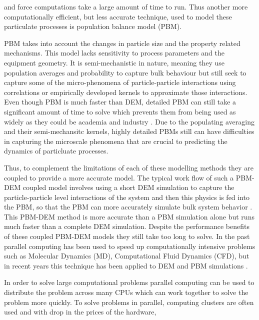 \documentclass[preprint,11pt,authoryear]{elsarticle}
\begin{document}
    and force computations take a large amount of time to run. Thus another more computationally 
    efficient, but less accurate technique, used to model these particulate processes is population 
    balance model (PBM).
	\par PBM takes into account the changes in particle size and the property related mechanisms. This 
    model lacks sensitivity to process parameters and the equipment geometry. It is semi-mechanistic in 
    nature, meaning they use population averages and probability to capture bulk behaviour but still 
    seek to capture some of the micro-phenomena of particle-particle interactions using correlations or 
    empirically developed kernels to approximate those interactions. Even though PBM is much faster 
    than DEM, detailed PBM can still take a significant amount of time to solve which prevents them 
    from being used as widely as they could be academia and industry \citep{Barrasso2013}. Due to the 
    populating averaging and their semi-mechansitc kernels, highly detailed PBMs still can have 
    difficulties in capturing the microscale phenomena that are crucial to predicting the dynamics of 
    particluate processes. 
	\par Thus, to complement the limitations of each of these modelling methods they are coupled to 
    provide a more accurate model.  The typical work flow of such a PBM-DEM coupled model involves 
    using a short DEM simulation to capture the particle-particle level interactions of the system and 
    then this physics is fed into the PBM, so that the PBM can more accurately simulate bulk system 
    behavior \citep{Goldschmidt2003} \citep{Reinhold2012}\citep{Barrasso2013}. This PBM-DEM 
    method is more accurate than a PBM simulation alone but runs much faster than a complete DEM 
    simulation. Despite the performance benefits of these coupled PBM-DEM models they still take too 
    long to solve. In the past parallel computing has been used to speed up computationally intensive 
    problems such as Molecular Dynamics (MD), Computational Fluid Dynamics (CFD), but in recent 
    years  this technique has been applied to DEM and PBM simulations 
    \citep{Bettencourt2017}\citep{Prakash2013a}\citep{Gunawan2008}.
	\par In order to solve large computational problems parallel computing can be used to distribute the 
    problem across many CPUs which can work together to solve the problem more quickly. To solve 
    problems in parallel, computing clusters are often used and with drop  in the prices of the hardware, 
\end{document}
